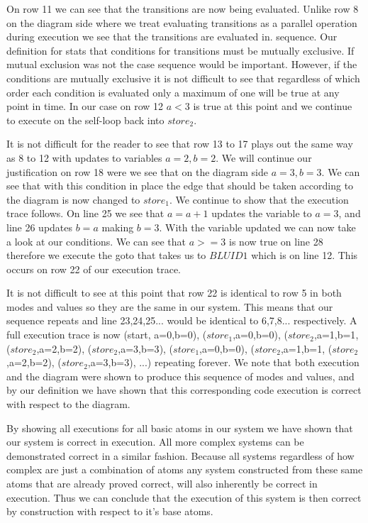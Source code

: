 On row 11 we can see that the transitions are now being evaluated. Unlike row 8 on the diagram side where
we treat evaluating transitions as a parallel operation during execution we see that the transitions are evaluated in. 
sequence. Our definition for \plcchart stats that conditions for transitions must be mutually exclusive.
If mutual exclusion was not the case sequence would be important. However, if the conditions are mutually
exclusive it is not difficult to see that regardless of which order each condition is evaluated only a maximum
of one will be true at any point in time. In our case on row 12 $a<3$ is true at this point and we continue to 
execute on the self-loop back into $store_2$.

It is not difficult for the reader to see that row 13 to 17 plays out the same way as 8 to 12 with updates to
variables $a=2, b=2$. We will continue our justification on row 18 were we see that on the diagram side $a=3,b=3$.
We can see that with this condition in place the edge that should be taken according to the diagram is now changed
to $store_1$. We continue to show that the execution trace follows. On line 25 we see that $a=a+1$ updates the 
variable to $a=3$, and line 26 updates $b=a$ making $b=3$. With the variable updated we can now take a look at our
conditions. We can see that $a >= 3$ is now true on line 28 therefore we execute the goto that takes us to $BLUID1$
which is on line 12. This occurs on row 22 of our execution trace.

It is not difficult to see at this point that row 22 is identical to row 5 in both modes and values so they are the
same in our system. This means that our sequence repeats and line 23,24,25... would be identical to 6,7,8... 
respectively. A full execution trace is now (start, {a=0,b=0}), ($store_1$,{a=0,b=0}), ($store_2$,{a=1,b=1},
($store_2$,{a=2,b=2}), ($store_2$,{a=3,b=3}), ($store_1$,{a=0,b=0}), ($store_2$,{a=1,b=1},
($store_2$,{a=2,b=2}), ($store_2$,{a=3,b=3}), ...) repeating forever. We note that both execution and the diagram
were shown to produce this sequence of modes and values, and by our definition we have shown that this 
corresponding code execution is correct with respect to the diagram. 

By showing all executions for all basic atoms in our system we have shown that our system is correct in execution.
All more complex systems can be demonstrated correct in a similar fashion. Because all systems regardless of how
complex are just a combination of atoms any system constructed from these same atoms that are already proved correct,
will also inherently be correct in execution. Thus we can conclude that the execution of this system is then correct
by construction with respect to it's base atoms.